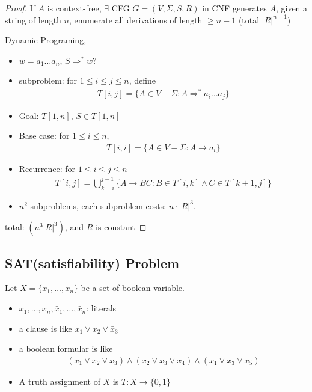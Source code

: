 \begin{proof}
    If $A$ is context-free, $\exists$ CFG $G=(V,\Sigma, S, R)$ in CNF generates $A$, given a string of length $n$, enumerate all derivations of length $\ge n-1$ (total $|R|^{n-1}$)

    Dynamic Programing, 
    \begin{itemize}
        \item $w=a_1 \dots a_n$, $S\Rightarrow^* w$?
        \item subproblem: for $1\le i\le j\le n$, define
        \begin{align*}
            T[i,j]=\{ A\in V-\Sigma : A\Rightarrow^* a_i\dots a_j \}
        \end{align*}
        \item Goal: $T[1,n]$, $S\in T[1,n]$
        \item Base case: for $1\le i\le n$,
        \begin{align*}
            T[i,i]=\{ A\in V-\Sigma: A\to a_i \}
        \end{align*}
        \item Recurrence: for $1\le i\le j\le n$
        \begin{align*}
            T[i,j]=\bigcup_{k=i}^{j-1} \{ A\to BC : B\in T[i,k] \land C\in T[k+1, j] \}
        \end{align*}
        \item $n^2$ subproblems, each subproblem costs: $n\cdot|R|^3$.
    \end{itemize}
    total: $\left( n^3 |R|^3 \right)$, and $R$ is constant
\end{proof}

\subsection{SAT(satisfiability) Problem}

Let $X=\{ x_1,\dots,x_n \}$ be a set of boolean variable. 
\begin{itemize}
    \item $x_1,\dots,x_n,\bar{x}_1,\dots,\bar{x}_n$: literals
    \item a clause is like $x_1\lor x_2 \lor \bar{x}_3$
    \item a boolean formular is like 
    \begin{align*}
        (x_1\lor x_2 \lor \bar{x}_3)\land (x_2\lor x_3 \lor \bar{x}_4)\land (x_1\lor x_3 \lor x_5)
    \end{align*}
    \item A truth assignment of $X$ is $T:X\to \{ 0,1 \}$
\end{itemize}


